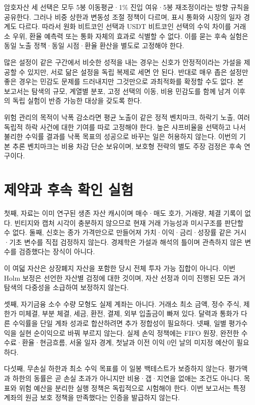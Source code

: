 \documentclass[11pt,a4paper]{article}
\begin{document}
암호자산 세 선택은 모두 5봉 이동평균·1\% 진입 여유·5봉 재조정이라는 방향 규칙을 공유한다. 그러나 비중 상한과 변동성 조절 정책이 다르며, 표시 통화와 시장의 일자 경계도 다르다. 따라서 원화 비트코인 선택과 USDT 비트코인 선택의 수익 차이를 거래소 우위, 환율 예측력 또는 통화 자체의 효과로 식별할 수 없다. 이를 묻는 후속 실험은 동일 노출 정책·동일 시점·환율 환산을 별도로 고정해야 한다.

많은 설정이 같은 구간에서 비슷한 성적을 내는 경우는 신호가 안정적이라는 가설을 제공할 수 있지만, 서로 닮은 설정을 독립 복제로 세면 안 된다. 반대로 매우 좁은 설정만 좋은 경우는 민감도 문제를 드러내지만 그것만으로 과최적화를 확정할 수도 없다. 본 보고서는 탐색의 규모, 계열별 분포, 고정 선택의 이동, 비용 민감도를 함께 남겨 이후의 독립 실험이 반증 가능한 대상을 갖도록 한다.

위험 관리의 목적이 낙폭 감소라면 평균 노출이 같은 정적 벤치마크, 하락기 노출, 여러 독립적 하락 사건에 대한 기여를 따로 고정해야 한다. 높은 샤프비율을 선택하고 나서 불리한 수익률 결과를 낙폭 목표의 성공으로 바꾸는 일은 허용하지 않는다. 이번의 기본 추론 벤치마크는 비용 차감 단순 보유이며, 보호형 전략의 별도 주장 검정은 후속 연구이다.

\section{제약과 후속 확인 실험}
첫째, 자료는 이미 연구된 생존 자산 캐시이며 매수·매도 호가, 거래량, 체결 기록이 없다. 빈티지와 캡처 시각이 충분하지 않으므로 현재 거래 가능성과 미시구조를 판단할 수 없다. 둘째, 신호는 종가 가격만으로 만들어져 가치·이익·금리·성장률 같은 거시·기초 변수를 직접 검정하지 않는다. 경제학은 가설과 해석의 틀이며 관측하지 않은 변수를 검증했다는 장식이 아니다.

이 여덟 자산은 상장폐지 자산을 포함한 당시 전체 투자 가능 집합이 아니다. 이번 Holm 보정은 선언한 자산별 검정에 대한 것이며, 자산 선정과 이미 진행된 모든 과거 탐색의 다중성을 소급하여 보정하지 않는다.

셋째, 자기금융 소수 수량 모형도 실제 계좌는 아니다. 거래소 최소 금액, 정수 주식, 제한가 미체결, 부분 체결, 세금, 환전, 결제, 외부 입출금이 빠져 있다. 달력과 통화가 다른 수익률을 단일 계좌 성과로 합산하려면 추가 정합성이 필요하다. 넷째, 일별 평가수익을 실현 순이익으로 바꿔 부르지 않는다. 실제 손익 정책에는 FIFO 원장, 완전한 수수료·환율·현금흐름, 서울 일자 경계, 첫날과 이전 이익 0인 날의 미지정 예산이 필요하다.

다섯째, 무손실 하한과 최소 수익 목표를 이 일봉 백테스트가 보증하지 않는다. 평가액과 하한의 동률은 곧 손실 초과가 아니지만 비용·갭·지연을 없애는 조건도 아니다. 목표와 위험 예산을 분리한 실행 정책은 독립적으로 시험해야 한다. 이번 보고서는 특정 계좌의 원금 보호 정책을 만족했다는 인증을 발급하지 않는다.
\end{document}
